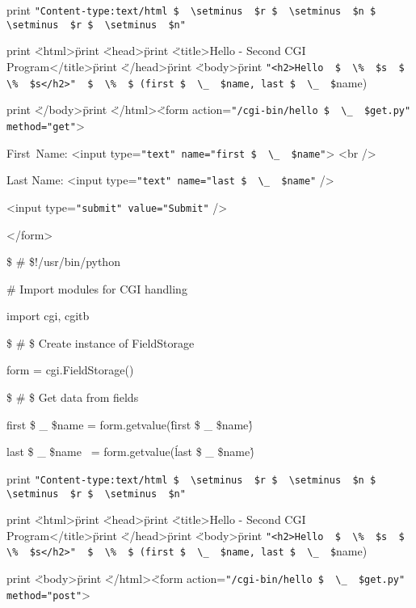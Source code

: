 \begin {enumerate}
\begin {enumerate}
print \verb|"Content-type:text/html $  \setminus  $r $  \setminus  $n $  \setminus  $r $  \setminus  $n"|

print \"<html>\"

print \"<head>\"

print \"<title>Hello - Second CGI Program</title>\"

print \"</head>\"

print \"<body>\"

print \verb|"<h2>Hello  $  \%  $s  $  \%  $s</h2>"  $  \%  $ (first $  \_  $name, last $  \_  $|name)

print \"</body>\"

print \"</html>\"

<form action=\verb|"/cgi-bin/hello $  \_  $get.py" method="get"|>

First~Name: <input type=\verb|"text" name="first $  \_  $name"|>  <br />

Last Name: <input type=\verb|"text" name="last $  \_  $name"| />

<input type=\verb|"submit" value="Submit"| /> 

</form>

 \$  \#  \$!/usr/bin/python

 $  \#  $ Import modules for CGI handling

import cgi, cgitb

 \$  \#  \$ Create instance of FieldStorage

form = cgi.FieldStorage()

\$  \#  \$ Get data from fields

first \$  \_  \$name = form.getvalue(\'first \$  \_  \$name\')

last \$  \_  \$name~ = form.getvalue(\'last \$  \_  \$name\')

print \verb|"Content-type:text/html $  \setminus  $r $  \setminus  $n $  \setminus  $r $  \setminus  $n"|

print \"<html>\"

print \"<head>\"

print \"<title>Hello - Second CGI Program</title>\"

print \"</head>\"

print \"<body>\"

print \verb|"<h2>Hello  $  \%  $s  $  \%  $s</h2>"  $  \%  $ (first $  \_  $name, last $  \_  $|name)

print \"<body>\"

print \"</html>\"

<form action=\verb|"/cgi-bin/hello $  \_  $get.py" method="post"|>


\end{enumerate}
\end{enumerate}
